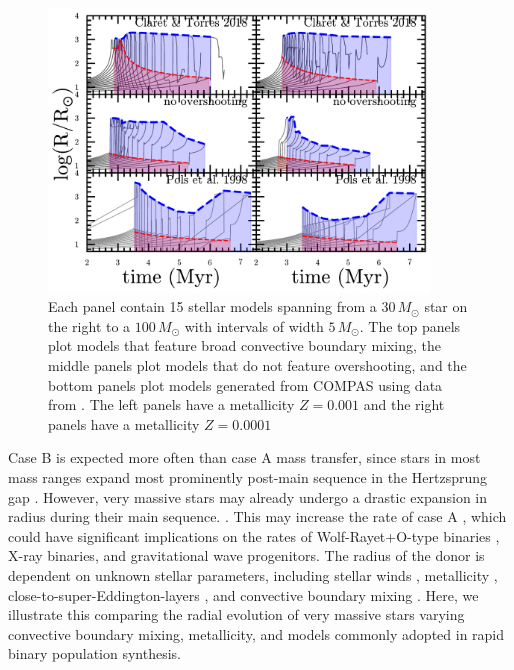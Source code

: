 \documentclass[twocolumn]{aastex63}
\begin{document}
\begin{figure}[htbp]
  \centering
  \includegraphics[width=0.9\textwidth]{radii}
  \caption{Each panel contain 15 stellar models spanning from a
    $30 \, M_{\odot}$ star on the right to a $100 \, M_{\odot}$ with
    intervals of width $5 \, M_{\odot}$. The top panels plot models
    that feature broad convective boundary mixing, the middle panels
    plot models that do not feature overshooting, and the bottom
    panels plot models generated from COMPAS using data from
    \cite{pols:98}. The left panels have a metallicity $Z=0.001$ and
    the right panels have a metallicity $Z=0.0001$}
  \label{fig:R_t_donor}
\end{figure}


Case B is expected more often than case A mass transfer, since stars
in most mass ranges expand most prominently post-main sequence in the
Hertzsprung gap \citep{vandenheuvel:69}. However, very massive stars
may already undergo a drastic expansion in radius during their main
sequence. \citep[e.g.,][]{sanyal:15, jiang:15, sabhahit:24}. This may
increase the rate of case A \citep{demink:08}, which could have
significant implications on the rates of Wolf-Rayet+O-type binaries
\citep[e.g.,][]{nuijten:24}, X-ray binaries, and gravitational wave
progenitors. The radius of the donor is dependent on unknown stellar
parameters, including stellar winds \citep{renzo:17, josiek:24},
metallicity \citep{xin:22}, close-to-super-Eddington-layers
\citep[e.g.,][]{joss:73, paxton:13, jiang: 15, agrawal:22}, and
convective boundary mixing \citep{anders:23, johnston:24}. Here, we
illustrate this comparing the radial evolution of very massive stars
varying convective boundary mixing, metallicity, and models commonly
adopted in rapid binary population synthesis.
\end{document}

